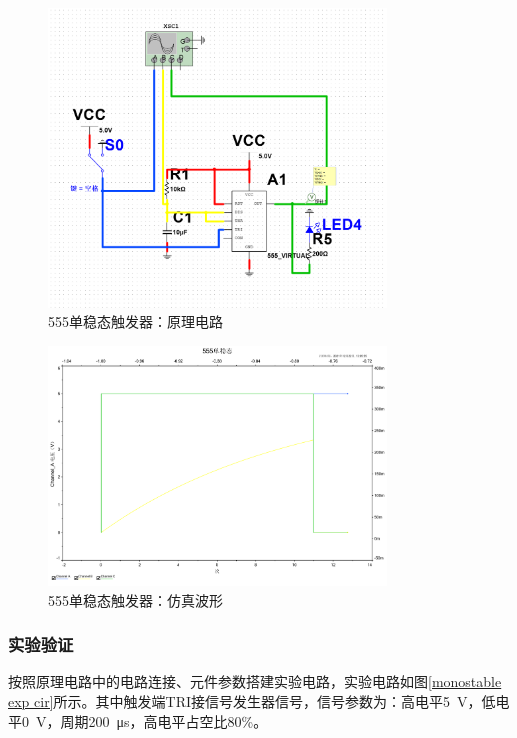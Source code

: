 \documentclass[UTF8]{ctexart}
\numberwithin{figure}{subsection}
\numberwithin{table}{subsection}
\numberwithin{equation}{subsection}
\begin{document}
\begin{figure}[H]
    \begin{center}
        \includegraphics[width=0.8\textwidth]{555/monostable/sim circuit.png}
    \end{center}
    \caption{555单稳态触发器：原理电路}
    \label{monostable sim cir}
\end{figure}

\begin{figure}[H]
    \begin{center}
        \includegraphics[width=0.8\textwidth]{555/monostable/sim result.pdf}
    \end{center}
    \caption{555单稳态触发器：仿真波形}
    \label{monostable sim res}
\end{figure}

\subsubsection{实验验证}
\par 按照原理电路中的电路连接、元件参数搭建实验电路，实验电路如图\ref{monostable exp cir}所示。其中触发端TRI接信号发生器信号，信号参数为：高电平\SI{5}{\volt}，低电平\SI{0}{\volt}，周期\SI{200}{\micro\second}，高电平占空比80\%。
\end{document}
